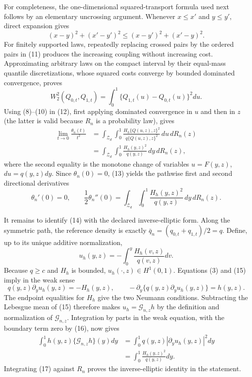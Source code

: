 For completeness, the one-dimensional squared-transport formula used next follows by an elementary uncrossing argument.  Whenever \(x\le x'\) and \(y\le y'\), direct expansion gives
\[
(x-y)^2+(x'-y')^2
\le (x-y')^2+(x'-y)^2.
\tag{11}
\]
For finitely supported laws, repeatedly replacing crossed pairs by the ordered pairs in (11) produces the increasing coupling without increasing cost.  Approximating arbitrary laws on the compact interval by their equal-mass quantile discretizations, whose squared costs converge by bounded dominated convergence, proves
\[
W_2^2(Q_{0,t},Q_{1,t})
=\int_0^1\{Q_{1,t}(u)-Q_{0,t}(u)\}^2du.
\tag{12}
\]
Using (8)--(10) in (12), first applying dominated convergence in \(u\) and then in \(z\) (the latter is valid because \(R_n\) is a probability law), gives
\[
\begin{aligned}
\lim_{t\to0}\frac{\theta_n(t)}{t^2}
&=\int_{\mathcal Z_d}\int_0^1
  \frac{H_h\{Q(u,z),z\}^2}{q\{Q(u,z),z\}^2}
  \,du\,dR_n(z)\\
&=\int_{\mathcal Z_d}\int_0^1
  \frac{H_h(y,z)^2}{q(y,z)}\,dy\,dR_n(z),
\end{aligned}
\tag{13}
\]
where the second equality is the monotone change of variables \(u=F(y,z)\), \(du=q(y,z)dy\).  Since \(\theta_n(0)=0\), (13) yields the pathwise first and second directional derivatives
\[
\theta_n'(0)=0,
\qquad
\frac12\theta_n''(0)
=\int_{\mathcal Z_d}\int_0^1
  \frac{H_h(y,z)^2}{q(y,z)}\,dy\,dR_n(z).
\tag{14}
\]

It remains to identify (14) with the declared inverse-elliptic form.  Along the symmetric path, the reference density is exactly \(\bar q_n=(q_{0,t}+q_{1,t})/2=q\).  Define, up to its unique additive normalization,
\[
u_h(y,z)=-\int_0^y\frac{H_h(v,z)}{q(v,z)}dv.
\tag{15}
\]
Because \(q\ge c\) and \(H_h\) is bounded, \(u_h(\cdot,z)\in H^1(0,1)\).  Equations (3) and (15) imply in the weak sense
\[
q(y,z)\partial_yu_h(y,z)=-H_h(y,z),
\qquad
-\partial_y\{q(y,z)\partial_yu_h(y,z)\}=h(y,z).
\tag{16}
\]
The endpoint equalities for \(H_h\) give the two Neumann conditions.  Subtracting the Lebesgue mean of (15) therefore makes \(u_h=\mathcal G_{n,z}h\) by the definition and normalization of \(\mathcal G_{n,z}\).  Integration by parts in the weak equation, with the boundary term zero by (16), now gives
\[
\begin{aligned}
\int_0^1h(y,z)\{\mathcal G_{n,z}h\}(y)dy
&=\int_0^1q(y,z)|\partial_yu_h(y,z)|^2dy\\
&=\int_0^1\frac{H_h(y,z)^2}{q(y,z)}dy.
\end{aligned}
\tag{17}
\]
Integrating (17) against \(R_n\) proves the inverse-elliptic identity in the statement.

